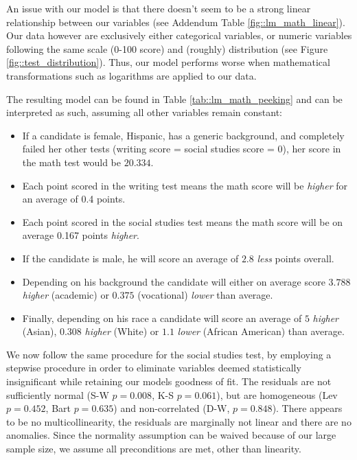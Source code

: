 \documentclass[10pt, a4paper]{article}
\begin{document}
	An issue with our model is that there doesn't seem to be a strong linear relationship between our variables (see Addendum Table \ref{fig::lm_math_linear}). Our data however are exclusively either categorical variables, or numeric variables following the same scale (0-100 score) and (roughly) distribution (see Figure \ref{fig::test_distribution}). Thus, our model performs worse when mathematical transformations such as logarithms are applied to our data.
	
	The resulting model can be found in Table \ref{tab::lm_math_peeking} and can be interpreted as such, assuming all other variables remain constant: 
	\begin{itemize}
		\item If a candidate is female, Hispanic, has a generic background, and completely failed her other tests (writing score = social studies score = 0), her score in the math test would be $20.334$. 
		\item Each point scored in the writing test means the math score will be \textit{higher} for an average of 0.4 points.
		\item Each point scored in the social studies test means the math score will be on average 0.167 points \textit{higher}.
		\item If the candidate is male, he will score an average of $2.8$ \textit{less} points overall.
		\item Depending on his background the candidate will either on average score $3.788$ \textit{higher} (academic) or $0.375$ (vocational) \textit{lower} than average.
		\item Finally, depending on his race a candidate will score an average of $5$ \textit{higher} (Asian), $0.308$ \textit{higher} (White) or $1.1$ \textit{lower} (African American) than average.
	\end{itemize}

	We now follow the same procedure for the social studies test, by employing a stepwise procedure in order to eliminate variables deemed statistically insignificant while retaining our models goodness of fit. The residuals are not sufficiently normal (S-W $p = 0.008$, K-S $p=0.061$), but are homogeneous (Lev $p = 0.452$, Bart $p = 0.635$) and non-correlated (D-W, $p=0.848$). There appears to be no multicollinearity, the residuals are marginally not linear and there are no anomalies. Since the normality assumption can be waived because of our large sample size, we assume all preconditions are met, other than linearity.
	
\end{document}

